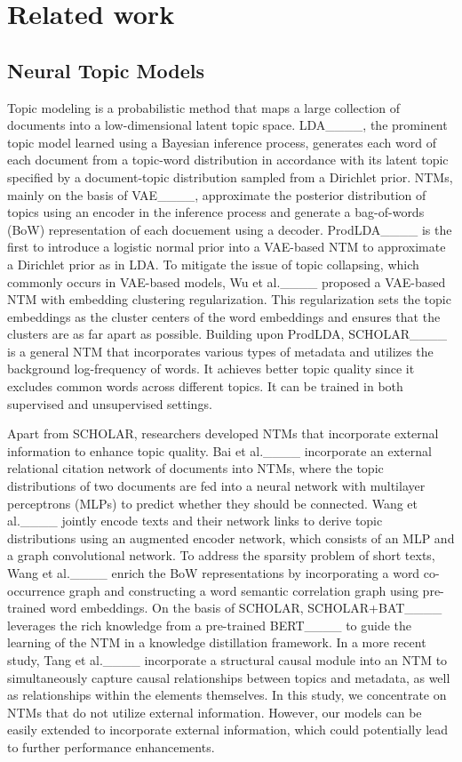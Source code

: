 \section{Related work}
\label{sec2}

\subsection{Neural Topic Models}
Topic modeling is a probabilistic method that maps a large collection of documents into a low-dimensional latent topic space.
LDA____, the prominent topic model learned using a Bayesian inference process, generates each word of each document from a topic-word distribution in accordance with its latent topic specified by a document-topic distribution sampled from a Dirichlet prior. 
NTMs, mainly on the basis of VAE____, approximate the posterior distribution of topics using an encoder in the inference process and generate a bag-of-words (BoW) representation of each docuement using a decoder. 
ProdLDA____ is the first to introduce a logistic normal prior into a VAE-based NTM to approximate a Dirichlet prior as in LDA. 
To mitigate the issue of topic collapsing, which commonly occurs in VAE-based models, Wu et al.____ proposed a VAE-based NTM with embedding clustering regularization. This regularization sets the topic embeddings as the cluster centers of the word embeddings and ensures that the clusters are as far apart as possible.
Building upon ProdLDA, SCHOLAR____ is a general NTM that incorporates various types of metadata and utilizes the background log-frequency of words. It achieves better topic quality since it excludes common words across different topics. It can be trained in both supervised and unsupervised settings.

Apart from SCHOLAR, researchers developed NTMs that incorporate external information to enhance topic quality.
Bai et al.____ incorporate an external relational citation network of documents into NTMs, where the topic distributions of two documents are fed into a neural network with multilayer perceptrons (MLPs) to predict whether they should be connected.
Wang et al.____ jointly encode texts and their network links to derive topic distributions using an augmented encoder network, which consists of an MLP and a graph convolutional network.
To address the sparsity problem of short texts, Wang et al.____ enrich the BoW representations by incorporating a word co-occurrence graph and constructing a word semantic correlation graph using pre-trained word embeddings.
On the basis of SCHOLAR, SCHOLAR+BAT____ leverages the rich knowledge from a pre-trained BERT____ to guide the learning of the NTM in a knowledge distillation framework.
In a more recent study, Tang et al.____ incorporate a structural causal module into an NTM to simultaneously capture causal relationships between topics and metadata, as well as relationships within the elements themselves.
In this study, we concentrate on NTMs that do not utilize external information. 
However, our models can be easily extended to incorporate external information, which could potentially lead to further performance enhancements.

